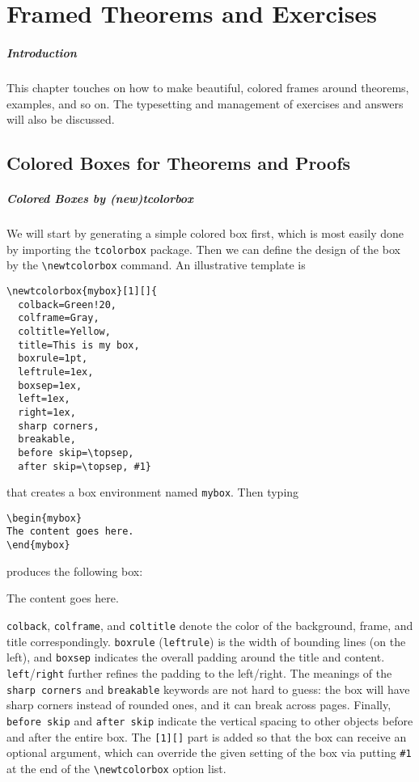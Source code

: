 \chapter{Framed Theorems and Exercises}

\paragraph{Introduction} This chapter touches on how to make beautiful, colored frames around theorems, examples, and so on. The typesetting and management of exercises and answers will also be discussed. 

\section{Colored Boxes for Theorems and Proofs}

\paragraph{Colored Boxes by (new)tcolorbox}
We will start by generating a simple colored box first, which is most easily done by importing the \texttt{tcolorbox} package. Then we can define the design of the box by the \texttt{\textbackslash newtcolorbox} command. An illustrative template is
\begin{lstlisting}
\newtcolorbox{mybox}[1][]{
  colback=Green!20, 
  colframe=Gray,
  coltitle=Yellow,
  title=This is my box,
  boxrule=1pt,
  leftrule=1ex,
  boxsep=1ex,
  left=1ex,
  right=1ex,
  sharp corners,
  breakable,
  before skip=\topsep,
  after skip=\topsep, #1}
\end{lstlisting}
that creates a box environment named \texttt{mybox}. Then typing
\begin{lstlisting}
\begin{mybox}
The content goes here.
\end{mybox}    
\end{lstlisting}
produces the following box:
\begin{mybox}
The content goes here.
\end{mybox}
\texttt{colback}, \texttt{colframe}, and \texttt{coltitle} denote the color of the background, frame, and title correspondingly. \texttt{boxrule} (\texttt{leftrule}) is the width of bounding lines (on the left), and \texttt{boxsep} indicates the overall padding around the title and content. \texttt{left}/\texttt{right} further refines the padding to the left/right. The meanings of the \texttt{sharp corners} and \texttt{breakable} keywords are not hard to guess: the box will have sharp corners instead of rounded ones, and it can break across pages. Finally, \texttt{before skip} and \texttt{after skip} indicate the vertical spacing to other objects before and after the entire box. The \texttt{[1][]} part is added so that the box can receive an optional argument, which can override the given setting of the box via putting \texttt{\#1} at the end of the \texttt{\textbackslash newtcolorbox} option list. 

